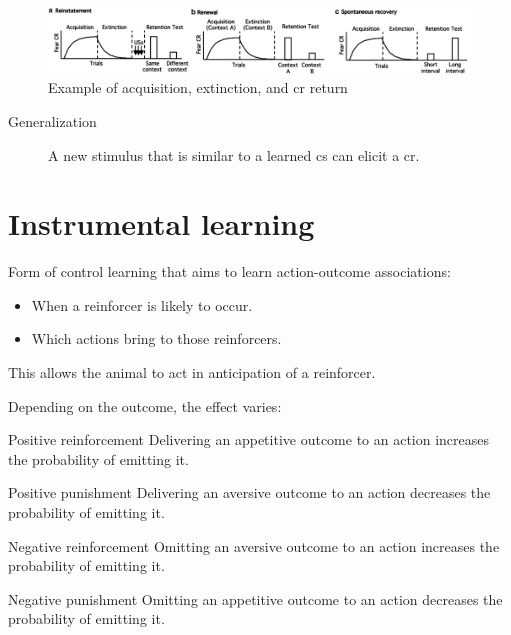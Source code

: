 \begin{figure}[H]
    \centering
    \includegraphics[width=\linewidth]{./img/pavlovian_extinction.png}
    \caption{Example of acquisition, extinction, and \ac{cr} return}
\end{figure}

\begin{description}
    \item[Generalization]  
        A new stimulus that is similar to a learned \acl{cs} can elicit a \acl{cr}.
\end{description}



\section{Instrumental learning}

Form of control learning that aims to learn action-outcome associations:
\begin{itemize}
    \item When a reinforcer is likely to occur.
    \item Which actions bring to those reinforcers.
\end{itemize}
This allows the animal to act in anticipation of a reinforcer.

Depending on the outcome, the effect varies:
\begin{descriptionlist}
    \item[Positive reinforcement] 
        Delivering an appetitive outcome to an action increases the probability of emitting it.

    \item[Positive punishment] 
        Delivering an aversive outcome to an action decreases the probability of emitting it.
    
    \item[Negative reinforcement] 
        Omitting an aversive outcome to an action increases the probability of emitting it.
    
    \item[Negative punishment] 
        Omitting an appetitive outcome to an action decreases the probability of emitting it.
\end{descriptionlist}

